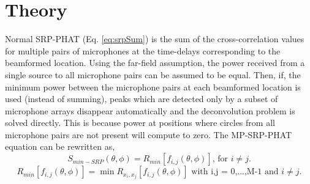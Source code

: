 \section{Theory}
Normal SRP-PHAT (Eq. \ref{eq:srpSum}) is the sum of the cross-correlation values for multiple pairs of microphones at the time-delays corresponding to the beamformed location. %
Using the far-field assumption, the power received from a single source to all microphone pairs can be assumed to be equal. Then, if, the minimum power between the microphone pairs at each beamformed location is used (instead of summing), peaks which are detected only by a subset of microphone arrays disappear automatically and the deconvolution problem is solved directly. This is because power at positions where circles from all microphone pairs are not present will compute to zero. The MP-SRP-PHAT equation can be rewritten as, 
\begin{equation}
    S_{min-SRP}(\theta,\phi)={R_{min}[f_{i,j}(\theta,\phi)]} \text{, for } i\neq j.
     \label{eq:srpSumminpow}
\end{equation}
\begin{equation}
    {R_{min}[f_{i,j}(\theta,\phi)]}=\min{{R_{x_i,x_j}[f_{i,j}(\theta,\phi)]}} \text{ with  i,j = 0,...,M-1 and } i\neq j.
     \label{eq:Rminpow}
\end{equation}
